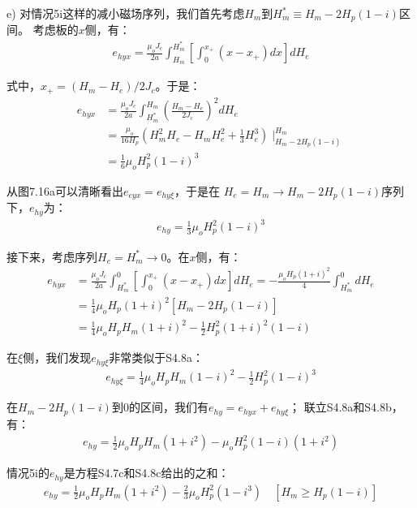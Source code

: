 e) 对情况5i这样的减小磁场序列，我们首先考虑$H_m$到$H_m^*\equiv H_m-2H_p(1-i)$区间。
考虑板的$x$侧，有：
\begin{align*}%
e_{hyx}=\frac{\mu_oJ_c}{2a}\int_{H_m}^{H_{m}^{*}}\left[\int_{0}^{x_+}(x-x_+)dx\right]dH_e \tag{S4.7a}
\end{align*}

式中，$x_+=(H_m-H_e)/2J_c$。于是：
\begin{align*}%
e_{hyx}&=\frac{\mu_oJ_c}{2a}\int_{H_{m}^{*}}^{H_m}\left(\frac{H_m-H_e}{2J_c}\right)^2dH_e \\\tag{S4.7b}
&=\frac{\mu_o}{16H_p}(H_{m}^{2}H_e-H_mH_{e}^{2}+\frac{1}{3}H_{e}^{3})\mid_{H_m-2H_p(1-i)}^{H_m} \\
&=\frac{1}{6}\mu_oH_{p}^{2}(1-i)^3
\end{align*}

从图7.16a可以清晰看出$e_{eyx}=e_{hy\xi}$，于是在
$H_e=H_m\rightarrow H_m-2H_p(1-i)$序列下，$e_{hy}$为：
\begin{align*}%
e_{hy}=\frac{1}{3}\mu_oH_{p}^{2}(1-i)^3 \tag{S4.7c}
\end{align*}

接下来，考虑序列$H_e=H_m^*\rightarrow0$。在$x$侧，有：
\begin{align*}%
e_{hyx}&=\frac{\mu_oJ_c}{2a}\int_{H_{m}^{*}}^{0}\left[\int_{0}^{x_+}(x-x_+)dx\right]dH_e=-\frac{\mu_oH_p(1+i)^2}{4}\int_{H_{m}^{*}}^{0}dH_e \\
&=\frac{1}{4}\mu_oH_p(1+i)^2[H_m-2H_p(1-i)] \\
&=\frac{1}{4}\mu_oH_pH_m(1+i)^2-\frac{1}{2}H_{p}^{2}(1+i)^2(1-i) \tag{S4.8a}
\end{align*}

在$\xi$侧，我们发现$e_{hy\xi}$非常类似于S4.8a：
\begin{align*}%
e_{hy\xi}=\frac{1}{4}\mu_oH_pH_m(1-i)^2-\frac{1}{2}H_{p}^{2}(1-i)^3 \tag{S4.8b}
\end{align*}

在$H_m-2H_p(1-i)$到0的区间，我们有$e_{hy}=e_{hyx}+e_{hy\xi}$；
联立S4.8a和S4.8b，有：
\begin{align*}%
e_{hy}=\frac{1}{2}\mu_oH_pH_m(1+i^2)-\mu_oH_{p}^{2}(1-i)(1+i^2) \tag{S4.8c}
\end{align*}

情况5i的$e_{hy}$是方程S4.7c和S4.8c给出的之和：
\begin{align*}%
e_{hy}=\frac{1}{2}\mu_oH_pH_m(1+i^2)-\frac{2}{3}\mu_oH_{p}^{2}(1-i^3) \quad [H_m\geq H_p(1-i)] \tag{7.23b}
\end{align*}

